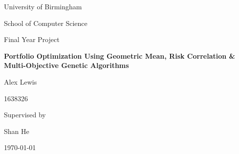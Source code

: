 \documentclass[11pt]{article}
\begin{document}
\begin{titlingpage}
    \centering\par
    {\huge University of Birmingham\par}
    {\small School of Computer Science\par}
        \vspace{0.8cm}
    {\Large Final Year Project\par}
        \vspace{0.8cm}
    {\Huge\bfseries Portfolio Optimization Using Geometric Mean, Risk Correlation 
        \& Multi-Objective Genetic Algorithms\par}
        \vspace{1.7cm}
    {\Large Alex Lewis\par}
    {\large 1638326 \par}
        \vspace{1cm}
    {\tiny Supervised by\par}
    {\Large Shan He\par}
        \vspace{0.7cm}
    {\large \today \par}
        \vspace{0.3cm}
        \hrulefill
        \vspace{0.3cm}
    \begin{abstract}
            \vspace{0.1cm}
            In modern portfolio theory an optimal portfolio is one which balances
            risk and reward. An efficient portfolio is one which lies along the
            edge of portfolios which cannot physically have higher return without
            increased risk. Portfolio optimization is the process of finding these
            efficient portfolios, and it's crucial from an investment standpoint
            so that an informed decision can be made as to how risky a portfolio
            is compared to its predicted return. An under explored area is risk
            evaluation. It is normally done using the Mean-Variance model, or
            value at risk. I propose a novel technique to find the correlation
            of assets inside a portfolio, and associating some mathematical
            value to this correlation. This set of calculations was applied
            from every asset to find the riskiness of a portfolio. Combining
            this with the classic return prediction of the geometric mean creates
            a multi-objective problem. This can then be efficiently solved

\end{abstract}
\end{titlingpage}
\end{document}

